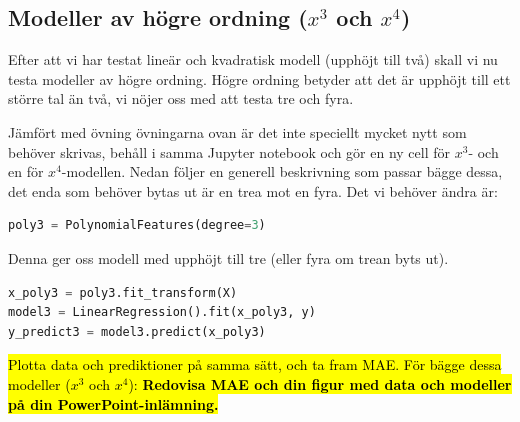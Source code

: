 \documentclass{article}
\begin{document}
\subsection{Modeller av högre ordning ($x^3$ och $x^4$)}
Efter att vi har testat lineär och kvadratisk modell (upphöjt till två) skall vi nu testa modeller av högre ordning. Högre ordning betyder att det är upphöjt till ett större tal än två, vi nöjer oss med att testa tre och fyra.

Jämfört med övning övningarna ovan är det inte speciellt mycket nytt som behöver skrivas, behåll i samma Jupyter notebook och gör en ny cell för $x^3$- och en för $x^4$-modellen. Nedan följer en generell beskrivning som passar bägge dessa, det enda som behöver bytas ut är en trea mot en fyra. Det vi behöver ändra är:
\begin{lstlisting}[language=Python]
poly3 = PolynomialFeatures(degree=3)
\end{lstlisting}
Denna ger oss modell med upphöjt till tre (eller fyra om trean byts ut).
\begin{lstlisting}[language=Python]
x_poly3 = poly3.fit_transform(X)
model3 = LinearRegression().fit(x_poly3, y)
y_predict3 = model3.predict(x_poly3)
\end{lstlisting}
\hl{Plotta data och prediktioner på samma sätt, och ta fram MAE.
För bägge dessa modeller ($x^3$ och $x^4$):
\textbf{Redovisa MAE och din figur med data och modeller på din PowerPoint-inlämning.}}
\end{document}
